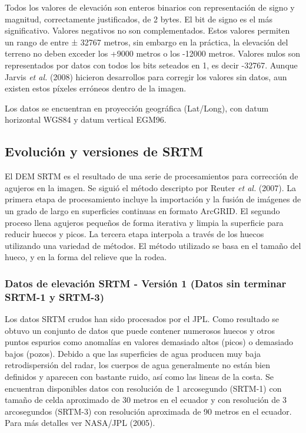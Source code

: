 \documentclass[10pt,a4paper, twoside]{report}
\begin{document}
Todos los valores de elevación son enteros binarios con representación de signo y magnitud, correctamente justificados, de 2 bytes. El bit de signo es el más significativo. Valores negativos no son complementados. Estos valores permiten un rango de entre ± 32767 metros, sin embargo en la práctica, la elevación del terreno no deben exceder los +9000 metros o los -12000 metros. Valores nulos son representados por datos con todos los bits seteados en 1, es decir -32767. Aunque Jarvis \textit{et al.} (2008) hicieron desarrollos para corregir los valores sin datos, aun existen estos píxeles erróneos dentro de la imagen.

Los datos se encuentran en proyección geográfica (Lat/Long), con datum horizontal WGS84 y datum vertical EGM96.

\subsection{Evolución y versiones de SRTM}

El DEM SRTM es el resultado de una serie de procesamientos para corrección de agujeros en la imagen. Se siguió el método descripto por Reuter \textit{et al.} (2007). La primera etapa de procesamiento incluye la importación y la fusión de imágenes de un grado de largo en superficies continuas en formato ArcGRID. El segundo proceso llena agujeros pequeños de forma iterativa y limpia la superficie para reducir huecos y picos. La tercera etapa interpola a través de los huecos utilizando una variedad de métodos. El método utilizado se basa en el tamaño del hueco, y en la forma del relieve que la rodea.

\subsubsection{Datos de elevación SRTM - Versión 1 (Datos sin terminar SRTM-1 y SRTM-3)}

Los datos SRTM crudos han sido procesados por el JPL. Como resultado se obtuvo un conjunto de datos que puede contener numerosos huecos y otros puntos espurios como anomalías en valores demasiado altos (picos) o demasiado bajos (pozos). Debido a que las superficies de agua producen muy baja retrodispersión del radar, los cuerpos de agua generalmente no están bien definidos y aparecen con bastante ruido, así como las lineas de la costa. Se encuentran disponibles datos con resolución de 1 arcosegundo (SRTM-1) con tamaño de celda aproximado de 30 metros en el ecuador y con resolución de 3 arcosegundos (SRTM-3) con resolución aproximada de 90 metros en el ecuador. Para más detalles ver NASA/JPL (2005).
\end{document}
